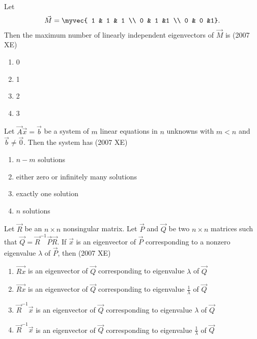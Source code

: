     \item Let $$\vec{M} =\myvec{ 1 & 1 & 1 \\ 0 & 1 &1 \\ 0 & 0 &1}.$$ Then the maximum number of linearly independent eigenvectors of $\vec{M}$ is
    \hfill{(2007 XE)}
    \begin{multicols}{4}
    \begin{enumerate}
        \item 0
        \item 1
        \item 2
        \item 3
     \end{enumerate}
     \end{multicols}
\item Let $\vec{A}\vec{x} = \vec{b}$ be a system of $m$ linear equations in $n$ unknowns with $m < n$ and $\vec{b} \neq \vec{0}$. Then the system has
    \hfill{(2007 XE)}
    \begin{multicols}{2}
    \begin{enumerate}
        \item $n - m$  solutions
        \item either zero or infinitely many solutions
        \item exactly one solution
        \item $n$  solutions
    \end{enumerate}
\end{multicols}
    \item Let $\vec{R}$ be an $n \times n $ nonsingular matrix. Let $\vec{P}$ and $\vec{Q}$ be two  $n \times n $ matrices such that $ \vec{Q} = \vec{R}^{-1}\vec{P}\vec{R} $. If $\vec{x}$  is an eigenvector of  $\vec{P}$ corresponding to a nonzero eigenvalue $\lambda$ of $\vec{P}$, then
    \hfill{(2007 XE)}
    \begin{enumerate}
        \item $\vec{Rx}$  is an eigenvector of $\vec{Q}$  corresponding to eigenvalue $\lambda$ of  $\vec{Q}$ 
        \item  $\vec{Rx}$  is an eigenvector of $\vec{Q}$  corresponding to eigenvalue $ \frac{1}{\lambda} $ of $\vec{Q}$ 
        \item $\vec{R}^{-1}\vec{x}$  is an eigenvector of $\vec{Q}$  corresponding to eigenvalue $\lambda$ of $\vec{Q}$ 
        \item $ \vec{R}^{-1}\vec{x}$ is an eigenvector of $\vec{Q}$  corresponding to eigenvalue $ \frac{1}{\lambda} $ of $\vec{Q}$ 
    \end{enumerate}
